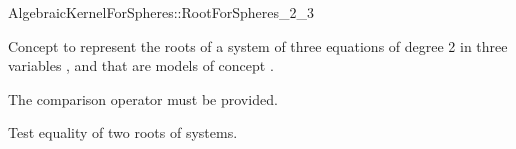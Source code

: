 \begin{ccRefConcept}{AlgebraicKernelForSpheres::RootForSpheres_2_3}

\ccDefinition

Concept to represent the roots of a system of three equations of degree 2
in three variables ,  and  that are models of concept
.



\ccOperations

The comparison operator \ccc{==} must be provided. 

{Test equality of two roots of systems.}

\ccHasModels


\ccSeeAlso


\end{ccRefConcept}

